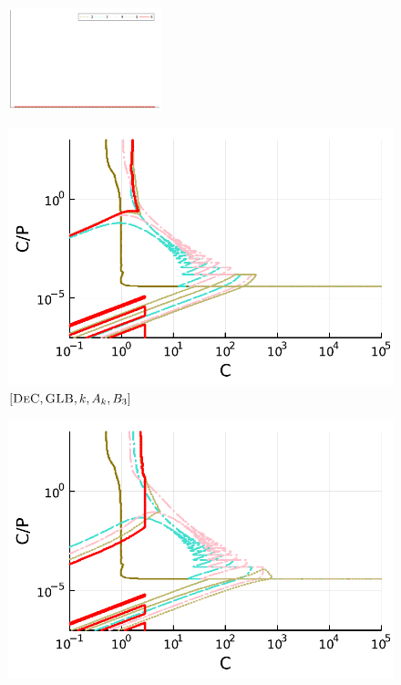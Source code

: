 \begin{figure}
	\centering
	\includegraphics[width=0.4\textwidth,trim={230 340 30 22}, clip]{pdf/pdepics/legends/colors_a-d_new_horiz_2-6_no_order.pdf}\\
	\begin{minipage}[t]{0.325\textwidth}
		\centering
		\includegraphics[width=\textwidth]{pdf/pdepics/disp/IMEXDeC_gaussLobatto_disp_advTMM_2-6_newE.pdf}
		\small$[\textsc{DeC}, \textsc{GLB},k,A_k,B_3]$\par
	\end{minipage}
	\begin{minipage}[t]{0.325\textwidth}
	\centering
	\includegraphics[width=\textwidth]{pdf/pdepics/disp/IMEXDeC_subtimesteps_gaussLobatto_disp_advTMM_2-6_newE.pdf}

\end{minipage}
\end{figure}
